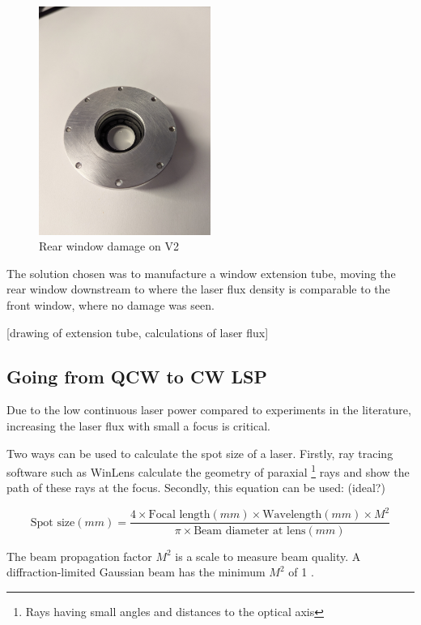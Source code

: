         \begin{figure}[!ht]
            \centering
            \includegraphics[width=0.5\textwidth]{assets/4 experiments/window damage.jpg}
            \caption{Rear window damage on V2}
        \end{figure}

        The solution chosen was to manufacture a window extension tube, moving the rear window downstream to where the laser flux density is comparable to the front window, where no damage was seen.

        [drawing of extension tube, calculations of laser flux]

    \subsection{Going from QCW to CW LSP}
                
        Due to the low continuous laser power compared to experiments in the literature, increasing the laser flux with small a focus is critical.

        Two ways can be used to calculate the spot size of a laser. Firstly, ray tracing software such as WinLens calculate the geometry of paraxial \footnote{Rays having small angles and distances to the optical axis} rays and show the path of these rays at the focus. Secondly, this equation \cite{LaserSpotSize} can be used: (ideal?)
        
        \[
        \text{Spot size}(mm) = \frac{4 \times \text{Focal length}(mm) \times \text{Wavelength}(mm) \times M^2}{\pi \times \text{Beam diameter at lens}(mm)}
        \]

        The beam propagation factor $M^2$ is a scale to measure beam quality. A diffraction-limited Gaussian beam has the minimum $M^2$ of 1 \cite{hechtUnderstandingLasersEntry2019}. 
        
